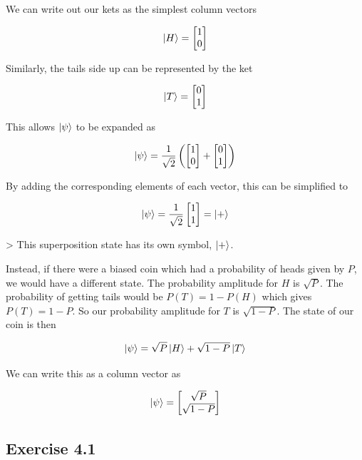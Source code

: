\documentclass{book}
\begin{document}
We can write out our kets as the simplest column vectors

$$
\ket{H} = 

\begin{bmatrix}
1 \\ 0
\end{bmatrix}
$$

Similarly, the tails side up can be represented by the ket

$$
\ket{T} = 

\begin{bmatrix}
0 \\ 1
\end{bmatrix}
$$

This allows $\ket{\psi} $ to be expanded as 

$$
\ket{\psi} = \frac{1}{\sqrt{2}}\left(\begin{bmatrix}
1 \\ 0
\end{bmatrix}+ \begin{bmatrix}
0 \\ 1
\end{bmatrix}\right)
$$

By adding the corresponding elements of each vector, this can be simplified to

$$ \ket{\psi} = \frac{1}{\sqrt{2}}\begin{bmatrix} 1 \\ 1 \end{bmatrix} = \ket{+}$$


> This superposition state has its own symbol, $\ket{+}$.

Instead, if there were a biased coin which had a probability of heads given by $P$, we would have a different state. The probability amplitude for $H$ is $\sqrt{P}$. The probability of getting tails would be $ P(T) = 1 - P(H)$ which gives $P(T) = 1 -P$. So our probability amplitude for $T$ is $\sqrt{1 - P}$. The state of our coin is then 

$$
\ket{\psi} = \sqrt{P}\ket{H} + \sqrt{1-P}\ket{T}
$$

We can write this as a column vector as

$$
\ket{\psi} = \begin{bmatrix}
\sqrt{P} \\ \sqrt{1-P}
\end{bmatrix}
$$


\hline
\subsection{Exercise 4.1 }
\end{document}
